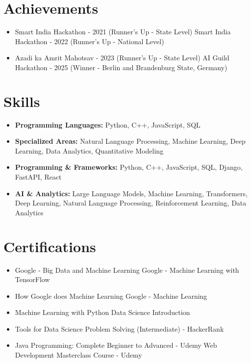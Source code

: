 \documentclass[a4paper,10pt]{article}
\begin{document}
\section*{Achievements}
\begin{itemize}
\item Smart India Hackathon - 2021 (Runner's Up - State Level) \hfill Smart India Hackathon - 2022 (Runner's Up - National Level)
\item Azadi ka Amrit Mahotsav - 2023 (Runner's Up - State Level) \hfill AI Guild Hackathon - 2025 (Winner - Berlin and Brandenburg State, Germany)
\end{itemize}

\section*{Skills}
\begin{itemize}
  \item \textbf{Programming Languages:} Python, C++, JavaScript, SQL
  \item \textbf{Specialized Areas:} Natural Language Processing, Machine Learning, Deep Learning, Data Analytics, Quantitative Modeling
  \item \textbf{Programming \& Frameworks:} Python, C++, JavaScript, SQL, Django, FastAPI, React
  \item \textbf{AI \& Analytics:} Large Language Models, Machine Learning, Transformers, Deep Learning, Natural Language Processing, Reinforcement Learning, Data Analytics
\end{itemize}

\section*{Certifications}
\begin{itemize}
\item Google - Big Data and Machine Learning \hfill Google - Machine Learning with TensorFlow
\item How Google does Machine Learning \hfill Google - Machine Learning
\item Machine Learning with Python \hfill Data Science Introduction
\item Tools for Data Science \hfill Problem Solving (Intermediate) - HackerRank
\item Java Programming: Complete Beginner to Advanced - Udemy \hfill Web Development Masterclass Course - Udemy
\end{itemize}
\end{document}
